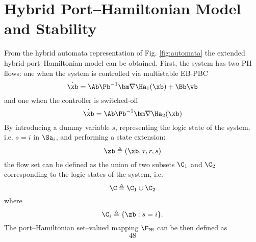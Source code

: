 \section{Hybrid Port--Hamiltonian Model and Stability}
%
From the hybrid automata representation of Fig. \ref{fig:automata} the extended hybrid port--Hamiltonian model can be obtained. First, the system has two PH flows: one when the system is controlled via multistable EB-PBC
%
\begin{equation}
    \dot{\xb} = \Ab\Pb^{-1}\bm\nabla\Ha_1(\xb) + \Bb\vb
\end{equation}
%
and one when the controller is switched-off
%
\begin{equation}
    \dot{\xb} = \Ab\Pb^{-1}\bm\nabla\Ha_2(\xb)
\end{equation}
%
By introducing a dummy variable $s$, representing the logic state of the system, i.e. $s = i$ in $\Sa_i$, and performing a state extension:
%
\begin{equation}
    \zb \triangleq \left(\xb, \tau,r,s\right)
\end{equation}
%
the flow set can be defined as the union of two subsets $\C_1$ and $\C_2$ corresponding to the logic states of the system, i.e.
%
\begin{equation}
    \C \triangleq \C_1\cup\C_2
\end{equation}
%
where
%
\begin{equation}
    \C_i\triangleq \{\zb: s = i\}.
\end{equation}
%
The port--Hamiltonian set--valued mapping $\F_{\tt PH}$ can be then defined as
%
\begin{equation}
48
\end{equation}
%
\clearpage
